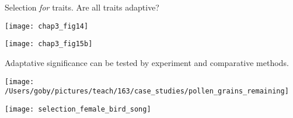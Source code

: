 \documentclass[t]{beamer}
\begin{document}
\begin{frame}[t]{Selection \emph{for} traits. \hfill Are all traits adaptive?}

\vspace{-\baselineskip}

\begin{multicols}{2}
\texttt{[image: chap3\_fig14]}

\columnbreak

\texttt{[image: chap3\_fig15b]}
\end{multicols}


\end{frame}

\begin{frame}[t]{Adaptative significance can be tested by experiment and comparative methods.}

\vspace{-\baselineskip}

\begin{multicols}{2}
\texttt{[image: /Users/goby/pictures/teach/163/case\_studies/pollen\_grains\_remaining]}

\columnbreak

\texttt{[image: selection\_female\_bird\_song]}

\end{multicols}

\end{frame}
\end{document}
